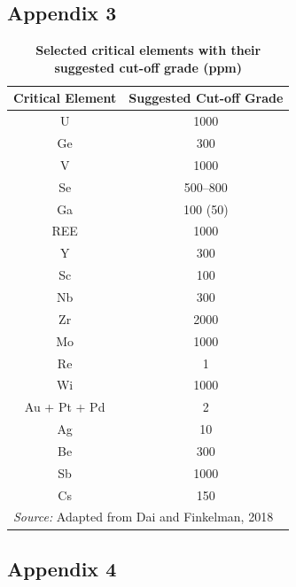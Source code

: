 \documentclass[11pt,a4paper,]{article}
\begin{document}
\newpage

\subsection{Appendix 3}\label{appendix-three}

\begin{table}
\centering
\caption{\label{tab:cutoff-grade}\textbf{Selected critical elements with their suggested cut-off grade (ppm)}}
\centering
\fontsize{10}{12}\selectfont
\begin{tabular}[t]{cc}
\toprule
Critical Element & Suggested Cut-off Grade\\
\midrule
U & 1000\\
Ge & 300\\
V & 1000\\
Se & 500–800\\
Ga & 100 (50)\\
\addlinespace
REE & 1000\\
Y & 300\\
Sc & 100\\
Nb & 300\\
Zr & 2000\\
\addlinespace
Mo & 1000\\
Re & 1\\
Wi & 1000\\
Au + Pt + Pd & 2\\
Ag & 10\\
\addlinespace
Be & 300\\
Sb & 1000\\
Cs & 150\\
\bottomrule
\multicolumn{2}{l}{\rule{0pt}{1em}\textit{Source: } Adapted from Dai and Finkelman, 2018}\\
\end{tabular}
\end{table}

\subsection{Appendix 4}\label{appendix-four}

\begingroup\fontsize{9}{11}\selectfont
\end{document}
